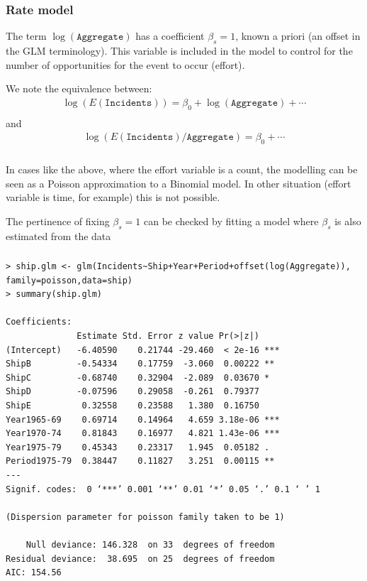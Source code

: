 \documentclass{beamer}
\newcommand{\bs}{\bigskip}
\begin{document}
\begin{frame}
\frametitle{Rate model}
The term
$\log(\texttt{Aggregate})$ has a coefficient $\beta_{s}=1$, known a priori (an
{\color{blue}offset} in the GLM terminology). This variable is included in the model
to control for the number of opportunities for the event to occur (effort).

\bs
We note the equivalence between:
\begin{eqnarray*}
\log(E(\texttt{Incidents})) = \beta_0 + \log(\texttt{Aggregate}) + \cdots \\
\end{eqnarray*}
and
\begin{eqnarray*}
\log(E(\texttt{Incidents})/\texttt{Aggregate}) =  \beta_0 + \cdots 
\end{eqnarray*}
\end{frame}

\begin{frame}
\frametitle{}In cases like the above, where the effort variable is a count, the 
modelling can be seen as a Poisson approximation to a Binomial model.  In other
situation (effort variable is time, for example) this is not possible.

\bs
\bs
 The pertinence of fixing $\beta_{s}=1$ can be checked by fitting a model where
 $\beta_{s}$ is also estimated from the data 
\end{frame}

\begin{frame}[fragile]
\frametitle{}

{\scriptsize
\begin{verbatim}
> ship.glm <- glm(Incidents~Ship+Year+Period+offset(log(Aggregate)),
family=poisson,data=ship)
> summary(ship.glm)

Coefficients:
              Estimate Std. Error z value Pr(>|z|)    
(Intercept)   -6.40590    0.21744 -29.460  < 2e-16 ***
ShipB         -0.54334    0.17759  -3.060  0.00222 ** 
ShipC         -0.68740    0.32904  -2.089  0.03670 *  
ShipD         -0.07596    0.29058  -0.261  0.79377    
ShipE          0.32558    0.23588   1.380  0.16750    
Year1965-69    0.69714    0.14964   4.659 3.18e-06 ***
Year1970-74    0.81843    0.16977   4.821 1.43e-06 ***
Year1975-79    0.45343    0.23317   1.945  0.05182 .  
Period1975-79  0.38447    0.11827   3.251  0.00115 ** 
---
Signif. codes:  0 ‘***’ 0.001 ‘**’ 0.01 ‘*’ 0.05 ‘.’ 0.1 ‘ ’ 1

(Dispersion parameter for poisson family taken to be 1)

    Null deviance: 146.328  on 33  degrees of freedom
Residual deviance:  38.695  on 25  degrees of freedom
AIC: 154.56
\end{verbatim}
}

\end{frame}
\end{document}
